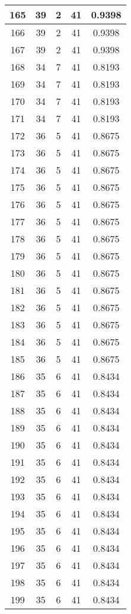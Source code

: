 \documentclass[letterpaper, 12pt]{article}
\begin{document}
\begin{longtable}{|c|c|c|c|c|}
\hline
165 & 39 & 2 & 41 & 0.9398 \\
\hline
166 & 39 & 2 & 41 & 0.9398 \\
\hline
167 & 39 & 2 & 41 & 0.9398 \\
\hline
168 & 34 & 7 & 41 & 0.8193 \\
\hline
169 & 34 & 7 & 41 & 0.8193 \\
\hline
170 & 34 & 7 & 41 & 0.8193 \\
\hline
171 & 34 & 7 & 41 & 0.8193 \\
\hline
172 & 36 & 5 & 41 & 0.8675 \\
\hline
173 & 36 & 5 & 41 & 0.8675 \\
\hline
174 & 36 & 5 & 41 & 0.8675 \\
\hline
175 & 36 & 5 & 41 & 0.8675 \\
\hline
176 & 36 & 5 & 41 & 0.8675 \\
\hline
177 & 36 & 5 & 41 & 0.8675 \\
\hline
178 & 36 & 5 & 41 & 0.8675 \\
\hline
179 & 36 & 5 & 41 & 0.8675 \\
\hline
180 & 36 & 5 & 41 & 0.8675 \\
\hline
181 & 36 & 5 & 41 & 0.8675 \\
\hline
182 & 36 & 5 & 41 & 0.8675 \\
\hline
183 & 36 & 5 & 41 & 0.8675 \\
\hline
184 & 36 & 5 & 41 & 0.8675 \\
\hline
185 & 36 & 5 & 41 & 0.8675 \\
\hline
186 & 35 & 6 & 41 & 0.8434 \\
\hline
187 & 35 & 6 & 41 & 0.8434 \\
\hline
188 & 35 & 6 & 41 & 0.8434 \\
\hline
189 & 35 & 6 & 41 & 0.8434 \\
\hline
190 & 35 & 6 & 41 & 0.8434 \\
\hline
191 & 35 & 6 & 41 & 0.8434 \\
\hline
192 & 35 & 6 & 41 & 0.8434 \\
\hline
193 & 35 & 6 & 41 & 0.8434 \\
\hline
194 & 35 & 6 & 41 & 0.8434 \\
\hline
195 & 35 & 6 & 41 & 0.8434 \\
\hline
196 & 35 & 6 & 41 & 0.8434 \\
\hline
197 & 35 & 6 & 41 & 0.8434 \\
\hline
198 & 35 & 6 & 41 & 0.8434 \\
\hline
199 & 35 & 6 & 41 & 0.8434 \\
\hline
\end{longtable}
\end{document}
